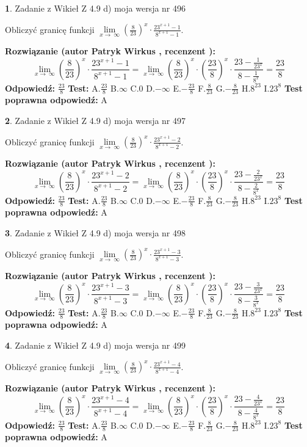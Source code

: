 \documentclass[12pt, a4paper]{article}
\theoremstyle{definition} %
\newtheorem{zad}{}
\newcommand{\zadStart}[1]{\begin{zad}#1\newline}
\newcommand{\zadStop}{\end{zad}}
\newcommand{\rozwStart}[2]{\noindent \textbf{Rozwiązanie (autor #1 , recenzent #2): }\newline}
\newcommand{\rozwStop}{\newline}
\newcommand{\odpStart}{\noindent \textbf{Odpowiedź:}\newline}
\newcommand{\odpStop}{\newline}
\newcommand{\testStart}{\noindent \textbf{Test:}\newline}
\newcommand{\testStop}{\newline}
\newcommand{\kluczStart}{\noindent \textbf{Test poprawna odpowiedź:}\newline}
\newcommand{\kluczStop}{\newline}
\begin{document}
\zadStart{Zadanie z Wikieł Z 4.9 d) moja wersja nr 496}


Obliczyć granicę funkcji  $\lim\limits_{x\to\ \infty}(\frac{8}{23})^{x}\cdot\frac{23^{x+1}-1}{8^{x+1}-1}$.
\zadStop
\rozwStart{Patryk Wirkus}{}
$$\lim\limits_{x\to\ \infty}(\frac{8}{23})^{x}\cdot\frac{23^{x+1}-1}{8^{x+1}-1}=\lim\limits_{x\to\ \infty}(\frac{8}{23})^{x}\cdot(\frac{23}{8})^{x} \cdot \frac{23-\frac{1}{23^{x}}}{8-\frac{1}{8^{x}}} = \frac{23}{8}$$
\rozwStop
\odpStart
$\frac{23}{8}$
\odpStop
\testStart
A.$\frac{23}{8}$ B.$\infty$ C.$0$ D.$-\infty$ E.$-\frac{23}{8}$
F.$\frac{8}{23}$ G.$-\frac{8}{23}$
H.$8^{23}$
I.$23^{8}$
\testStop
\kluczStart
A
\kluczStop



\zadStart{Zadanie z Wikieł Z 4.9 d) moja wersja nr 497}


Obliczyć granicę funkcji  $\lim\limits_{x\to\ \infty}(\frac{8}{23})^{x}\cdot\frac{23^{x+1}-2}{8^{x+1}-2}$.
\zadStop
\rozwStart{Patryk Wirkus}{}
$$\lim\limits_{x\to\ \infty}(\frac{8}{23})^{x}\cdot\frac{23^{x+1}-2}{8^{x+1}-2}=\lim\limits_{x\to\ \infty}(\frac{8}{23})^{x}\cdot(\frac{23}{8})^{x} \cdot \frac{23-\frac{2}{23^{x}}}{8-\frac{2}{8^{x}}} = \frac{23}{8}$$
\rozwStop
\odpStart
$\frac{23}{8}$
\odpStop
\testStart
A.$\frac{23}{8}$ B.$\infty$ C.$0$ D.$-\infty$ E.$-\frac{23}{8}$
F.$\frac{8}{23}$ G.$-\frac{8}{23}$
H.$8^{23}$
I.$23^{8}$
\testStop
\kluczStart
A
\kluczStop



\zadStart{Zadanie z Wikieł Z 4.9 d) moja wersja nr 498}


Obliczyć granicę funkcji  $\lim\limits_{x\to\ \infty}(\frac{8}{23})^{x}\cdot\frac{23^{x+1}-3}{8^{x+1}-3}$.
\zadStop
\rozwStart{Patryk Wirkus}{}
$$\lim\limits_{x\to\ \infty}(\frac{8}{23})^{x}\cdot\frac{23^{x+1}-3}{8^{x+1}-3}=\lim\limits_{x\to\ \infty}(\frac{8}{23})^{x}\cdot(\frac{23}{8})^{x} \cdot \frac{23-\frac{3}{23^{x}}}{8-\frac{3}{8^{x}}} = \frac{23}{8}$$
\rozwStop
\odpStart
$\frac{23}{8}$
\odpStop
\testStart
A.$\frac{23}{8}$ B.$\infty$ C.$0$ D.$-\infty$ E.$-\frac{23}{8}$
F.$\frac{8}{23}$ G.$-\frac{8}{23}$
H.$8^{23}$
I.$23^{8}$
\testStop
\kluczStart
A
\kluczStop



\zadStart{Zadanie z Wikieł Z 4.9 d) moja wersja nr 499}


Obliczyć granicę funkcji  $\lim\limits_{x\to\ \infty}(\frac{8}{23})^{x}\cdot\frac{23^{x+1}-4}{8^{x+1}-4}$.
\zadStop
\rozwStart{Patryk Wirkus}{}
$$\lim\limits_{x\to\ \infty}(\frac{8}{23})^{x}\cdot\frac{23^{x+1}-4}{8^{x+1}-4}=\lim\limits_{x\to\ \infty}(\frac{8}{23})^{x}\cdot(\frac{23}{8})^{x} \cdot \frac{23-\frac{4}{23^{x}}}{8-\frac{4}{8^{x}}} = \frac{23}{8}$$
\rozwStop
\odpStart
$\frac{23}{8}$
\odpStop
\testStart
A.$\frac{23}{8}$ B.$\infty$ C.$0$ D.$-\infty$ E.$-\frac{23}{8}$
F.$\frac{8}{23}$ G.$-\frac{8}{23}$
H.$8^{23}$
I.$23^{8}$
\testStop
\kluczStart
A
\kluczStop
\end{document}

